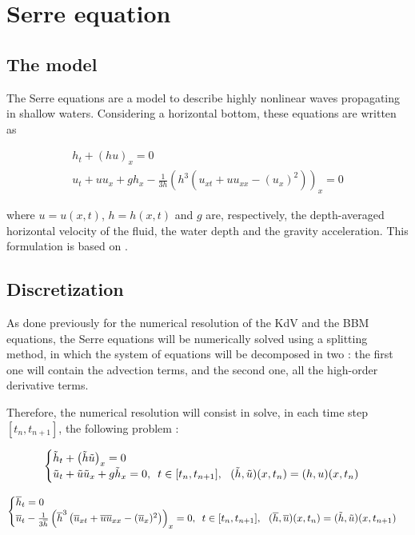 \section{Serre equation}
\label{sec:Serre}

\subsection{The model}

\indent The Serre equations are a model to describe highly nonlinear waves propagating in shallow waters. Considering a horizontal bottom, these equations are written as

\begin{gather}
\label{eq:SerreFull1}
h_t + (hu)_x = 0 \\
\label{eq:SerreFull2}
u_t + uu_x + gh_x - \frac{1}{3h}\left(h^3 \left( u_{xt} + uu_{xx} - (u_x)^2  \right) \right)_x = 0
\end{gather}

\noindent where $u = u(x,t)$, $h = h(x,t)$ and $g$ are, respectively, the depth-averaged horizontal velocity of the fluid, the water depth and the gravity acceleration. This formulation is based on \cite{CarterCienfuegos2011}.

\subsection{Discretization}

\indent As done previously for the numerical resolution of the KdV and the BBM equations, the Serre equations will be numerically solved using a splitting method, in which the system of equations will be decomposed in two : the first one will contain the advection terms, and the second one, all the high-order derivative terms.

\indent Therefore, the numerical resolution will consist in solve, in each time step $[t_n, t_{n+1}]$, the following problem :

\begin{equation}
\label{eq:SerreSplit1}
\begin{cases}
\th_t + \left(\th\tu\right)_x = 0 \\
\tu_t + \tu\tu_x + g\th_x = 0, \ \, t \in [t_n, t_{n+1}], \ \  (\th,\tu)(x,t_n) = (h,u)(x,t_n)
\end{cases}
\end{equation}

\begin{equation}
\label{eq:SerreSplit2}
\begin{cases}
\lh_t   = 0 \\
\lu_t - \frac{1}{3\lh}\left(\lh^3 \left( \lu_{xt} + \lu\lu_{xx} - (\lu_x)^2  \right) \right)_x = 0, \ \, t \in [t_n, t_{n+1}], \ \  (\lh,\lu)(x,t_n) = (\th,\tu)(x,t_{n+1})
\end{cases}
\end{equation}

